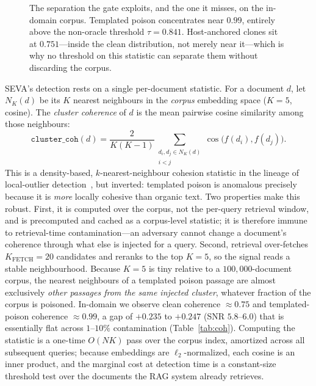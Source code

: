 \documentclass[10pt,journal,compsoc]{IEEEtran}
\begin{document}
\begin{figure}[t]
\caption{The separation the gate exploits, and the one it misses, on the in-domain corpus.
Templated poison concentrates near $0.99$, entirely above the non-oracle threshold
$\tau=0.841$. Host-anchored clones sit at $0.751$---inside the clean distribution, not merely
near it---which is why no threshold on this statistic can separate them without discarding the
corpus.}
\label{fig:dist}
\end{figure}
SEVA's detection rests on a single per-document statistic. For a document $d$,
let $N_K(d)$ be its $K$ nearest neighbours in the \emph{corpus} embedding space
($K=5$, cosine). The \emph{cluster coherence} of $d$ is the mean pairwise cosine
similarity among those neighbours:
\[
\texttt{cluster\_coh}(d) = \frac{2}{K(K-1)}
\sum_{\substack{d_i,d_j \in N_K(d)\\ i<j}} \cos\!\big(f(d_i),f(d_j)\big).
\]
This is a density-based, $k$-nearest-neighbour cohesion statistic in the lineage of
local-outlier detection~\cite{lof}, but inverted: templated poison is anomalous
precisely because it is \emph{more} locally cohesive than organic text.
Two properties make this robust. First, it is computed over the corpus, not the
per-query retrieval window, and is precomputed and cached as a corpus-level
statistic; it is therefore immune to retrieval-time contamination---an adversary
cannot change a document's coherence through what else is injected for a query.
Second, retrieval over-fetches $K_{\mathrm{FETCH}}=20$ candidates and reranks to
the top $K=5$, so the signal reads a stable neighbourhood. Because $K=5$ is tiny
relative to a $100{,}000$-document corpus, the nearest neighbours of a templated
poison passage are almost exclusively \emph{other passages from the same injected
cluster}, whatever fraction of the corpus is poisoned. In-domain we observe clean
coherence $\approx 0.75$ and templated-poison coherence $\approx 0.99$, a gap of
$+0.235$ to $+0.247$ (SNR $5.8$--$6.0$) that is essentially flat across $1$--$10\%$
contamination (Table~\ref{tab:coh}).
Computing the statistic is a one-time $O(NK)$ pass over the corpus index, amortized
across all subsequent queries; because embeddings are $\ell_2$-normalized, each
cosine is an inner product, and the marginal cost at detection time is a
constant-size threshold test over the documents the RAG system already retrieves.
\end{document}
